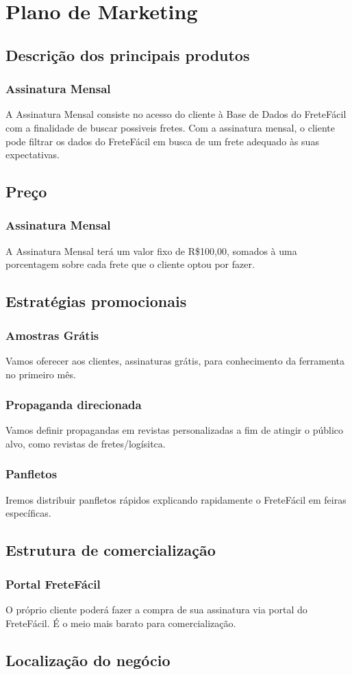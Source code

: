 \chapter{Plano de Marketing}\label{marketing}

\section{Descrição dos principais produtos}

\subsection{Assinatura Mensal}
A Assinatura Mensal consiste no acesso do cliente à Base de Dados do FreteFácil com a finalidade de buscar possiveis fretes. Com a assinatura mensal, o cliente pode filtrar os dados do FreteFácil em busca de um frete adequado às suas expectativas.

\section{Preço}

\subsection{Assinatura Mensal}
A Assinatura Mensal terá um valor fixo de R\$100,00, somados à uma porcentagem sobre cada frete que o cliente optou por fazer.
   
\section{Estratégias promocionais}
\subsection{Amostras Grátis}
Vamos oferecer aos clientes, assinaturas grátis, para conhecimento da ferramenta no primeiro mês.

\subsection{Propaganda direcionada}
Vamos definir propagandas em revistas personalizadas a fim de atingir o público alvo, como revistas de fretes/logísitca.

\subsection{Panfletos}
Iremos distribuir panfletos rápidos explicando rapidamente o FreteFácil em feiras específicas.

\section{Estrutura de comercialização}
\subsection{Portal FreteFácil}
O próprio cliente poderá fazer a compra de sua assinatura via portal do FreteFácil. É o meio mais barato para comercialização.


\section{Localização do negócio}

 